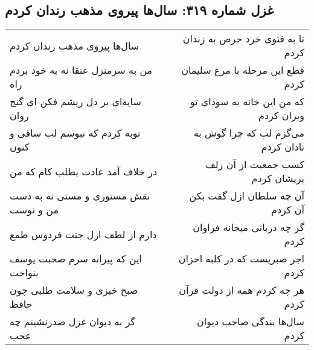 \begin{center}
\section*{غزل شماره ۳۱۹: سال‌ها پیروی مذهب رندان کردم}
\label{sec:sh319}
\begin{longtable}{l p{0.5cm} r}
سال‌ها پیروی مذهب رندان کردم
&&
تا به فتوی خرد حرص به زندان کردم
\\
من به سرمنزل عنقا نه به خود بردم راه
&&
قطع این مرحله با مرغ سلیمان کردم
\\
سایه‌ای بر دل ریشم فکن ای گنج روان
&&
که من این خانه به سودای تو ویران کردم
\\
توبه کردم که نبوسم لب ساقی و کنون
&&
می‌گزم لب که چرا گوش به نادان کردم
\\
در خلاف آمد عادت بطلب کام که من
&&
کسب جمعیت از آن زلف پریشان کردم
\\
نقش مستوری و مستی نه به دست من و توست
&&
آن چه سلطان ازل گفت بکن آن کردم
\\
دارم از لطف ازل جنت فردوس طمع
&&
گر چه دربانی میخانه فراوان کردم
\\
این که پیرانه سرم صحبت یوسف بنواخت
&&
اجر صبریست که در کلبه احزان کردم
\\
صبح خیزی و سلامت طلبی چون حافظ
&&
هر چه کردم همه از دولت قرآن کردم
\\
گر به دیوان غزل صدرنشینم چه عجب
&&
سال‌ها بندگی صاحب دیوان کردم
\\
\end{longtable}
\end{center}
